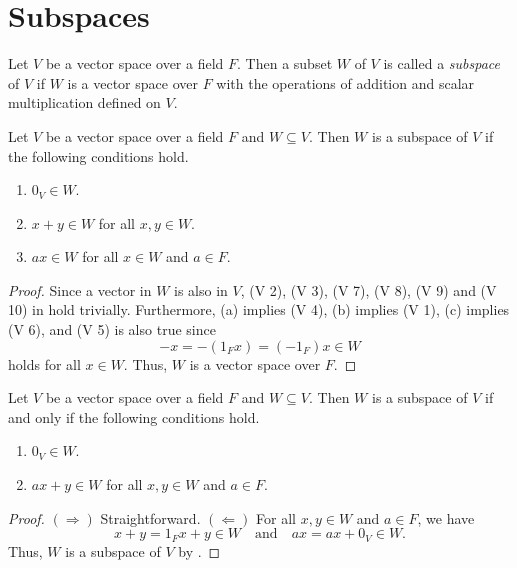\section{Subspaces}
\begin{definition}\label{def:subspace}
  Let $V$ be a vector space over a field $F$.
  Then a subset $W$ of $V$ is called a \emph{subspace} of $V$ if $W$ is a
  vector space over $F$ with the operations of addition and scalar
  multiplication defined on $V$.
\end{definition}

\begin{theorem}\label{thm:subspace}
  Let $V$ be a vector space over a field $F$ and $W \subseteq V$.
  Then $W$ is a subspace of $V$ if the following conditions hold.
  \begin{enumerate}
    \item $0_V \in W$.
    \item $x + y \in W$ for all $x, y \in W$.
    \item $ax \in W$ for all $x \in W$ and $a \in F$.
  \end{enumerate}
\end{theorem}
\begin{proof}
  Since a vector in $W$ is also in $V$, (V 2), (V 3), (V 7), (V 8), (V 9) and
  (V 10) in  hold trivially.
  Furthermore, (a) implies (V 4), (b) implies (V 1), (c) implies (V 6), and
  (V 5) is also true since
  \begin{equation*}
    -x = -(1_Fx) = (-1_F)x \in W
  \end{equation*}
  holds for all $x \in W$.
  Thus, $W$ is a vector space over $F$.
\end{proof}

\begin{corollary}\label{cor:subspace}
  Let $V$ be a vector space over a field $F$ and $W \subseteq V$.
  Then $W$ is a subspace of $V$ if and only if the following conditions hold.
  \begin{enumerate}
    \item $0_V \in W$.
    \item $ax + y \in W$ for all $x, y \in W$ and $a \in F$.
  \end{enumerate}
\end{corollary}
\begin{proof}
  $(\Rightarrow)$ Straightforward.
  $(\Leftarrow)$ For all $x, y \in W$ and $a \in F$, we have
  \begin{equation*}
    x + y = 1_F x + y \in W
    \quad \text{and} \quad
    ax = ax + 0_V \in W.
  \end{equation*}
  Thus, $W$ is a subspace of $V$ by .
\end{proof}

